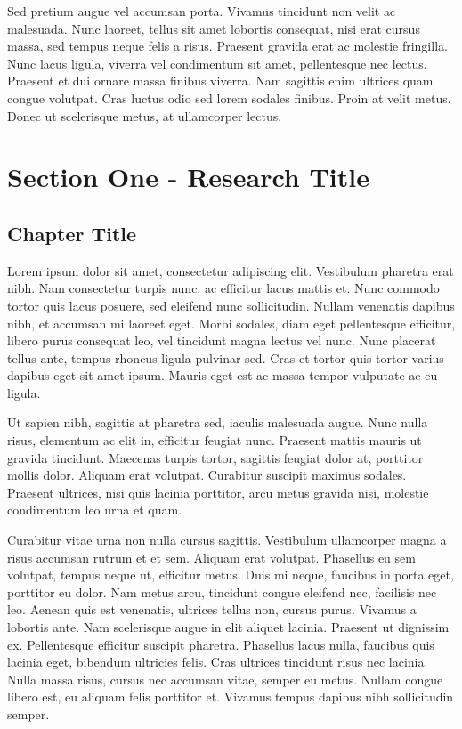 \documentclass[a4paper]{memoir}
\begin{document}
Sed pretium augue vel accumsan porta. Vivamus tincidunt non velit ac malesuada. Nunc laoreet, tellus sit amet lobortis consequat, nisi erat cursus massa, sed tempus neque felis a risus. Praesent gravida erat ac molestie fringilla. Nunc lacus ligula, viverra vel condimentum sit amet, pellentesque nec lectus. Praesent et dui ornare massa finibus viverra. Nam sagittis enim ultrices quam congue volutpat. Cras luctus odio sed lorem sodales finibus. Proin at velit metus. Donec ut scelerisque metus, at ullamcorper lectus. 

\part{Section One - Research Title}
\label{sectionone-researchtitle}

\chapter{Chapter Title}
\label{chaptertitle}

Lorem ipsum dolor sit amet, consectetur adipiscing elit. Vestibulum pharetra erat nibh. Nam consectetur turpis nunc, ac efficitur lacus mattis et. Nunc commodo tortor quis lacus posuere, sed eleifend nunc sollicitudin. Nullam venenatis dapibus nibh, et accumsan mi laoreet eget. Morbi sodales, diam eget pellentesque efficitur, libero purus consequat leo, vel tincidunt magna lectus vel nunc. Nunc placerat tellus ante, tempus rhoncus ligula pulvinar sed. Cras et tortor quis tortor varius dapibus eget sit amet ipsum. Mauris eget est ac massa tempor vulputate ac eu ligula. 

Ut sapien nibh, sagittis at pharetra sed, iaculis malesuada augue. Nunc nulla risus, elementum ac elit in, efficitur feugiat nunc. Praesent mattis mauris ut gravida tincidunt. Maecenas turpis tortor, sagittis feugiat dolor at, porttitor mollis dolor. Aliquam erat volutpat. Curabitur suscipit maximus sodales. Praesent ultrices, nisi quis lacinia porttitor, arcu metus gravida nisi, molestie condimentum leo urna et quam. 

Curabitur vitae urna non nulla cursus sagittis. Vestibulum ullamcorper magna a risus accumsan rutrum et et sem. Aliquam erat volutpat. Phasellus eu sem volutpat, tempus neque ut, efficitur metus. Duis mi neque, faucibus in porta eget, porttitor eu dolor. Nam metus arcu, tincidunt congue eleifend nec, facilisis nec leo. Aenean quis est venenatis, ultrices tellus non, cursus purus. Vivamus a lobortis ante. Nam scelerisque augue in elit aliquet lacinia. Praesent ut dignissim ex. Pellentesque efficitur suscipit pharetra. Phasellus lacus nulla, faucibus quis lacinia eget, bibendum ultricies felis. Cras ultrices tincidunt risus nec lacinia. Nulla massa risus, cursus nec accumsan vitae, semper eu metus. Nullam congue libero est, eu aliquam felis porttitor et. Vivamus tempus dapibus nibh sollicitudin semper. 
\end{document}
